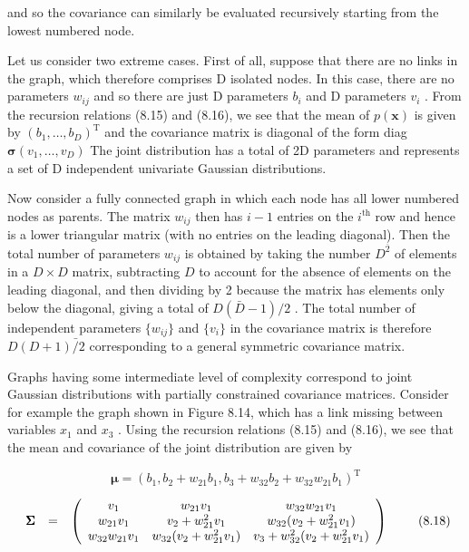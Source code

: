 \documentclass[
  10
]{article}
\begin{document}
and so the covariance can similarly be evaluated recursively starting
from the lowest numbered node.

Let us consider two extreme cases. First of all, suppose that there are
no links in the graph, which therefore comprises D isolated nodes. In
this case, there are no parameters \(w _ { i j }\) and so there are just
D parameters \(b _ { i }\) and D parameters \(v _ { i }\) . From the
recursion relations (8.15) and (8.16), we see that the mean of
\(p ( \mathbf { x } )\) is given by
\(( b _ { 1 } , \ldots , b _ { D } ) ^ { \mathrm { T } }\) and the
covariance matrix is diagonal of the form diag
\(\mathbf { \sigma } ( v _ { 1 } , \dots , v _ { D } )\) The joint
distribution has a total of 2D parameters and represents a set of D
independent univariate Gaussian distributions.

Now consider a fully connected graph in which each node has all lower
numbered nodes as parents. The matrix \(w _ { i j }\) then has \(i - 1\)
entries on the \(i ^ { \mathrm { t h } }\) row and hence is a lower
triangular matrix (with no entries on the leading diagonal). Then the
total number of parameters \(w _ { i j }\) is obtained by taking the
number \(D ^ { \overline { { 2 } } }\) of elements in a \(D \times D\)
matrix, subtracting \(D\) to account for the absence of elements on the
leading diagonal, and then dividing by 2 because the matrix has elements
only below the diagonal, giving a total of \(D ( \bar { D } - 1 ) / 2\)
. The total number of independent parameters \(\{ w _ { i j } \}\) and
\(\{ v _ { i } \}\) in the covariance matrix is therefore
\(D ( D + 1 ) \bar { / } 2\) corresponding to a general symmetric
covariance matrix.

Graphs having some intermediate level of complexity correspond to joint
Gaussian distributions with partially constrained covariance matrices.
Consider for example the graph shown in Figure 8.14, which has a link
missing between variables \(x _ { 1 }\) and \(x _ { 3 }\) . Using the
recursion relations (8.15) and (8.16), we see that the mean and
covariance of the joint distribution are given by

\[
{\pmb {\mu}} {=} {(b _ {1}, b _ {2} + w _ {2 1} b _ {1}, b _ {3} + w _ {3 2} b _ {2} + w _ {3 2} w _ {2 1} b _ {1}) ^ {\mathrm{T}}}\tag{8.17}
\]

\[
\begin{array}{r l r} {\pmb {\Sigma}} & {=} & {\left( \begin{array}{c c c} v _ {1} & w _ {2 1} v _ {1} & w _ {3 2} w _ {2 1} v _ {1} \\ w _ {2 1} v _ {1} & v _ {2} + w _ {2 1} ^ {2} v _ {1} & w _ {3 2} (v _ {2} + w _ {2 1} ^ {2} v _ {1}) \\ w _ {3 2} w _ {2 1} v _ {1} & w _ {3 2} (v _ {2} + w _ {2 1} ^ {2} v _ {1}) & v _ {3} + w _ {3 2} ^ {2} (v _ {2} + w _ {2 1} ^ {2} v _ {1}) \end{array} \right)} \end{array}\tag{8.18}
\]
\end{document}
